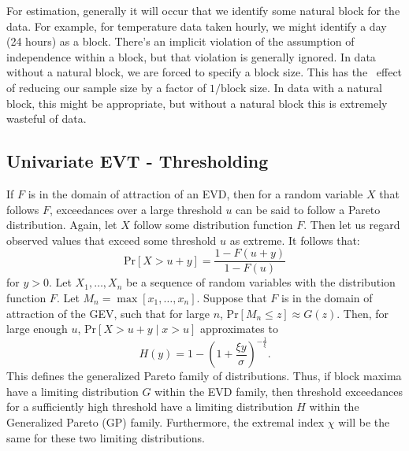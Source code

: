
For estimation, generally it will occur that we identify some natural block for
  the data.  For example, for temperature data taken hourly, we might identify a
  day (24 hours) as a block.  There's an implicit violation of the assumption of
  independence within a block, but that violation is generally ignored.  In data
  without a natural block, we are forced to specify a block size.  This has the \
  effect of reducing our sample size by a factor of $1/\text{block size}$.  In
  data with a natural block, this might be appropriate, but without a natural
  block this is extremely wasteful of data.
  

\subsection{Univariate EVT - Thresholding}
If $F$ is in the domain of attraction of an EVD, then for a random variable $X$
  that follows $F$, exceedances over a large threshold $u$ can be said to follow
  a Pareto distribution.  Again, let $X$ follow some distribution function $F$.
  Then let us regard observed values that exceed some threshold $u$ as extreme.
  It follows that:
\begin{equation*}
\text{Pr}\left[X > u + y\right] = \frac{1 - F(u + y)}{1 - F(u)}
\end{equation*}
for $y > 0$.  Let $X_1,\ldots,X_n$ be a sequence of random variables with the
  distribution function $F$.  Let $M_n = \max[x_1,\ldots,x_n]$.  Suppose that
  $F$ is in the domain of attraction of the GEV, such that for large $n$,
  $\text{Pr}[M_n \leq z]\approx G(z)$.  Then, for large enough $u$,
  $\text{Pr}[X > u+y\mid x > u]$ approximates to
\begin{equation*}
  \label{eqn:gp}
H(y) = 1 - \left(1 + \frac{\xi y}{\sigma}\right)^{-\frac{1}{\xi}}.
\end{equation*}
This defines the generalized Pareto family of distributions.  Thus, if block
  maxima have a limiting distribution $G$ within the EVD family, then threshold
  exceedances for a sufficiently high threshold have a limiting distribution $H$
  within the Generalized Pareto (GP) family.  Furthermore, the extremal index $\chi$
  will be the same for these two limiting distributions. 

